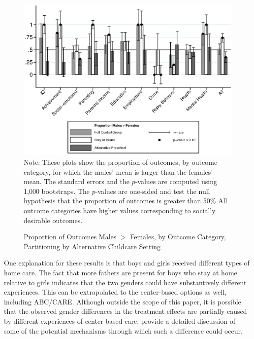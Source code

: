 \begin{figure}[H]
\centering
\caption{Proportion of Outcomes Males $>$ Females, by Outcome Category, Partitioning by Alternative Childcare Setting}
\label{fig:proportion-altpre}
	\includegraphics[width=\textwidth]{output/gendergaps-control-moderated-altpre}
\footnotesize \justify
Note: These plots show the proportion of outcomes, by outcome category, for which the males' mean is larger than the females' mean. The standard errors and the $p$-values are computed using 1,000 bootstraps. The $p$-values are one-sided and test the null hypothesis that the proportion of outcomes is greater than 50\% All outcome categories have higher values corresponding to socially desirable outcomes.
\end{figure}

One explanation for these results is that boys and girls received different types of home care. The fact that more fathers are present for boys who stay at home relative to girls indicates that the two genders could have substantively different experiences. This can be extrapolated to the center-based options as well, including ABC/CARE. Although outside the scope of this paper, it is possible that the observed gender differences in the treatment effects are partially caused by different experiences of center-based care. \citet{Magnuson_Kelchen_Duncan_etal_2016_ECRQ} provide a detailed discussion of some of the potential mechanisms through which such a difference could occur.


